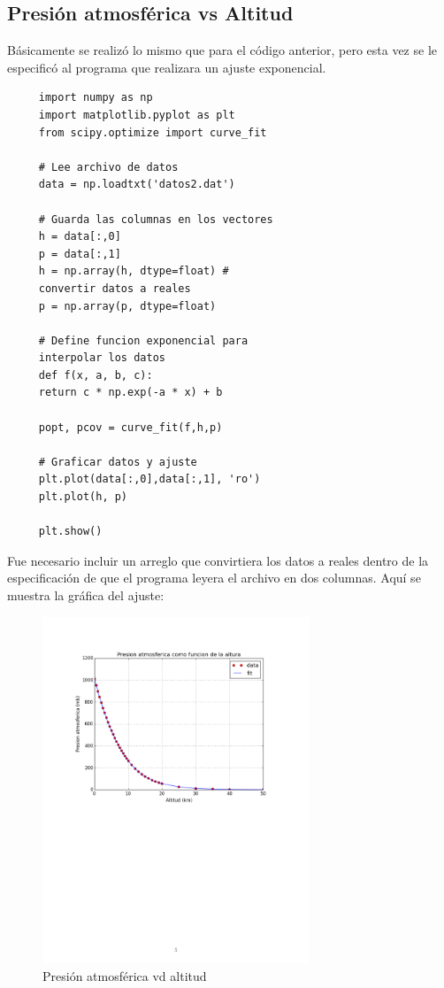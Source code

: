 \documentclass[12 pt,twocolumn]{article}
\begin{document}
	\subsection{\small Presión atmosférica vs Altitud}
	Básicamente se realizó lo mismo que para el código anterior, pero esta vez se le  especificó al programa que realizara un ajuste exponencial.
	 \begin{verbatim}
	 import numpy as np
	 import matplotlib.pyplot as plt
	 from scipy.optimize import curve_fit
	 
	 # Lee archivo de datos
	 data = np.loadtxt('datos2.dat')
	 
	 # Guarda las columnas en los vectores
	 h = data[:,0]
	 p = data[:,1]
	 h = np.array(h, dtype=float) # 
	 convertir datos a reales
	 p = np.array(p, dtype=float) 
	 
	 # Define funcion exponencial para 
	 interpolar los datos
	 def f(x, a, b, c):
	 return c * np.exp(-a * x) + b
	 
	 popt, pcov = curve_fit(f,h,p)
	 
	 # Graficar datos y ajuste
	 plt.plot(data[:,0],data[:,1], 'ro')
	 plt.plot(h, p)
	 
	 plt.show()
	 \end{verbatim}
Fue necesario incluir un arreglo que convirtiera los datos a reales dentro de la especificación de que el programa leyera el archivo en dos columnas.
Aquí se muestra la gráfica del ajuste:
	\begin{figure}[H]
		\centering
		\includegraphics[width=8cm]{ajuste2.png}
		\caption{Presión atmosférica vd altitud}
	\end{figure}
\end{document}
